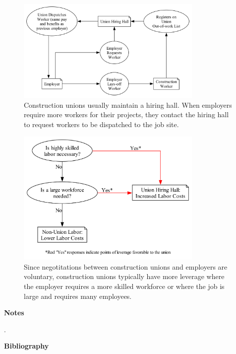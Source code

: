 \begin{figure}
  \centering
  \includegraphics[width=0.8\textwidth]{images/hiring_hall}
  \captionsetup{justification=centering, singlelinecheck=false, margin=2cm} 
  \caption{Construction unions usually maintain a hiring hall. When employers require more workers for their projects, they contact the hiring hall to request workers to be dispatched to the job site.}
  \label{fig:hiring_hall}
\end{figure}

\begin{figure}
  \centering
  \includegraphics[width=0.8\textwidth]{images/union_power_red}
  \captionsetup{justification=centering, singlelinecheck=false, margin=2cm} 
  \caption{Since negotitations between construction unions and employers are voluntary, construction unions typically have more leverage where the employer requires a more skilled workforce or where the job is large and requires many employees.}
  \label{fig:union_power_red}
\end{figure}



\newpage

\begin{center}
{\bfseries Notes}
\end{center}

\noindent
.
\newpage
\begin{center}
{\bfseries Bibliography}
\end{center}



